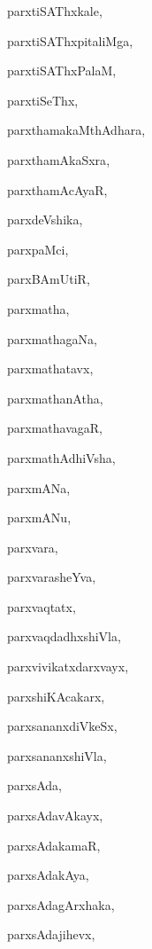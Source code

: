 \begin{multicols}{2}
{parxtiSAThxkale}, \pageref{parxtiSAThxkale}

{parxtiSAThxpitaliMga}, \pageref{parxtiSAThxpitaliMga}

{parxtiSAThxPalaM}, \pageref{parxtiSAThxPalaM}

{parxtiSeThx}, \pageref{parxtiSeThx}

{parxthamakaMthAdhara}, \pageref{parxthamakaMthAdhara}

{parxthamAkaSxra}, \pageref{parxthamAkaSxra}

{parxthamAcAyaR}, \pageref{parxthamAcAyaR}

{parxdeVshika}, \pageref{parxdeVshika}

{parxpaMci}, \pageref{parxpaMci}

{parxBAmUtiR}, \pageref{parxBAmUtiR}

{parxmatha}, \pageref{parxmatha}

{parxmathagaNa}, \pageref{parxmathagaNa}

{parxmathatavx}, \pageref{parxmathatavx}

{parxmathanAtha}, \pageref{parxmathanAtha}

{parxmathavagaR}, \pageref{parxmathavagaR}

{parxmathAdhiVsha}, \pageref{parxmathAdhiVsha}

{parxmANa}, \pageref{parxmANa}

{parxmANu}, \pageref{parxmANu}

{parxvara}, \pageref{parxvara}

{parxvarasheYva}, \pageref{parxvarasheYva}

{parxvaqtatx}, \pageref{parxvaqtatx}

{parxvaqdadhxshiVla}, \pageref{parxvaqdadhxshiVla}

{parxvivikatxdarxvayx}, \pageref{parxvivikatxdarxvayx}

{parxshiKAcakarx}, \pageref{parxshiKAcakarx}

{parxsananxdiVkeSx}, \pageref{parxsananxdiVkeSx}

{parxsananxshiVla}, \pageref{parxsananxshiVla}

{parxsAda}, \pageref{parxsAda}

{parxsAdavAkayx}, \pageref{parxsAdavAkayx}

{parxsAdakamaR}, \pageref{parxsAdakamaR}

{parxsAdakAya}, \pageref{parxsAdakAya}

{parxsAdagArxhaka}, \pageref{parxsAdagArxhaka}

{parxsAdajihevx}, \pageref{parxsAdajihevx}


\end{multicols}
